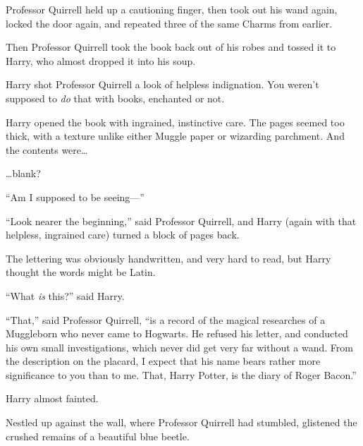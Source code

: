 Professor Quirrell held up a cautioning finger, then took out his wand
again, locked the door again, and repeated three of the same Charms from
earlier.

Then Professor Quirrell took the book back out of his robes and tossed
it to Harry, who almost dropped it into his soup.

Harry shot Professor Quirrell a look of helpless indignation. You
weren't supposed to \emph{do} that with books, enchanted or not.

Harry opened the book with ingrained, instinctive care. The pages seemed
too thick, with a texture unlike either Muggle paper or wizarding
parchment. And the contents were\ldots{}

\ldots{}blank?

``Am I supposed to be seeing---''

``Look nearer the beginning,'' said Professor Quirrell, and Harry (again
with that helpless, ingrained care) turned a block of pages back.

The lettering was obviously handwritten, and very hard to read, but
Harry thought the words might be Latin.

``What \emph{is} this?'' said Harry.

``That,'' said Professor Quirrell, ``is a record of the magical
researches of a Muggleborn who never came to Hogwarts. He refused his
letter, and conducted his own small investigations, which never did get
very far without a wand. From the description on the placard, I expect
that his name bears rather more significance to you than to me. That,
Harry Potter, is the diary of Roger Bacon.''

Harry almost fainted.

Nestled up against the wall, where Professor Quirrell had stumbled,
glistened the crushed remains of a beautiful blue beetle.
